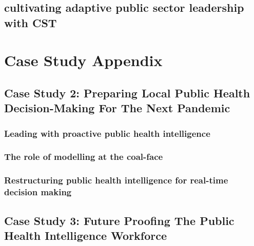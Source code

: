\documentclass{tufte-book}
\begin{document}
\chapter{cultivating adaptive public sector leadership with CST}


\part{Case Study Appendix}

\chapter{Case Study 2: Preparing Local Public Health Decision-Making For The Next Pandemic}
\section{Leading with proactive public health intelligence}
\section{The role of modelling at the coal-face}
\section{Restructuring public health intelligence for real-time decision making}
\chapter{Case Study 3: Future Proofing The Public Health Intelligence Workforce} \label{ch:case_study_3}




\backmatter


\printindex
\end{document}
